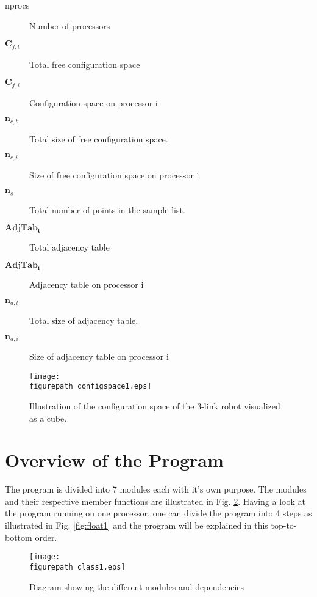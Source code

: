 \begin{description}

\item[nprocs] Number of processors
\item[$\mathbf C_{f,t}$] Total free configuration space
\item[$\mathbf C_{f,i}$] Configuration space on processor i
\item[$\mathbf n_{c,t}$] Total size of free configuration space.
\item[$\mathbf n_{c,i}$] Size of free configuration space on processor i
\item[$\mathbf n_{s}$] Total number of points in the sample list.
\item[$\mathbf{ AdjTab_{t}}$] Total adjacency table
\item[$\mathbf{ AdjTab_{i}}$] Adjacency table on processor i
\item[$\mathbf n_{a,t}$] Total size of adjacency table.
\item[$\mathbf n_{a,i}$] Size of adjacency table on processor i

\end{description}



\begin{figure}[h!] 
 \center 
 \texttt{[image: \\figurepath configspace1.eps]}
 \caption{ Illustration of the configuration space of the 3-link robot visualized as a cube. \label{fig:cs1}}
 \end{figure}


\section{\textbf{Overview of the Program}}

The program is divided into 7 modules each with it's own purpose. The modules and their respective member functions are illustrated in Fig. \ref{fig:class1}. Having a look at the program running on one processor, one can divide the program into 4 steps as illustrated in Fig. \ref{fig:float1} and the program will be explained in this top-to-bottom order. 

\begin{figure}[h!] 
 \center 
 \texttt{[image: \\figurepath class1.eps]}
 \caption{ Diagram showing the different modules and dependencies \label{fig:class1}}
 \end{figure}

